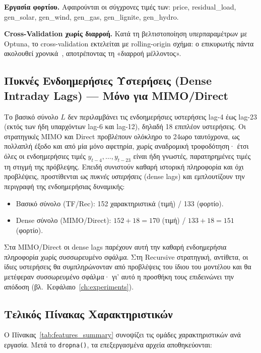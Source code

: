 \textbf{Εργασία φορτίου.} Αφαιρούνται οι σύγχρονες τιμές των: price, residual\_load,
gen\_solar, gen\_wind, gen\_gas, gen\_lignite, gen\_hydro.

\textbf{Cross-Validation χωρίς διαρροή.} Κατά τη βελτιστοποίηση υπερπαραμέτρων με
Optuna, το cross-validation εκτελείται με rolling-origin σχήμα: ο επικυρωτής πάντα
ακολουθεί χρονικά~\cite{bergmeir2018}, αποτρέποντας τη «διαρροή μέλλοντος».


\subsection{Πυκνές Ενδοημερήσιες Υστερήσεις (Dense Intraday Lags) — Μόνο για MIMO/Direct}

Το βασικό σύνολο $L$ δεν περιλαμβάνει τις ενδοημερήσιες υστερήσεις lag-4 έως lag-23 (εκτός των ήδη υπαρχόντων lag-6 και lag-12), δηλαδή 18 επιπλέον υστερήσεις. Οι στρατηγικές MIMO και Direct προβλέπουν ολόκληρο το 24ωρο ταυτόχρονα, ως πολλαπλή έξοδο και από μία μόνο αφετηρία, χωρίς αναδρομική τροφοδότηση· έτσι όλες οι ενδοημερήσιες τιμές $y_{t-4}, \ldots, y_{t-23}$ είναι ήδη γνωστές, παρατηρημένες τιμές τη στιγμή της πρόβλεψης. Επειδή συνιστούν καθαρή ιστορική πληροφορία και όχι προβλέψεις, προστίθενται ως \emph{πυκνές υστερήσεις} (dense lags) και εμπλουτίζουν την περιγραφή της ενδοημερήσιας δυναμικής:

\begin{itemize}
  \item Βασικό σύνολο (TF/Rec): 152 χαρακτηριστικά (τιμή) / 133 (φορτίο).
  \item Dense σύνολο (MIMO/Direct): $152 + 18 = 170$ (τιμή) / $133 + 18 = 151$ (φορτίο).
\end{itemize}

Στα MIMO/Direct οι dense lags παρέχουν αυτή την καθαρή ενδοημερήσια πληροφορία χωρίς συσσωρευμένο σφάλμα. Στη Recursive στρατηγική, αντίθετα, οι ίδιες υστερήσεις θα συμπληρώνονταν από προβλέψεις του ίδιου του μοντέλου και θα μετέφεραν συσσωρευμένο σφάλμα· γι' αυτό η προσθήκη τους επιδεινώνει την απόδοση (βλ.\ Κεφάλαιο~\ref{ch:experiments}).


\subsection{Τελικός Πίνακας Χαρακτηριστικών}
\label{subsec:final_table}

Ο Πίνακας~\ref{tab:features_summary} συνοψίζει τις ομάδες χαρακτηριστικών ανά εργασία.
Μετά το \texttt{dropna()}, τα επεξεργασμένα αρχεία αποθηκεύονται:

